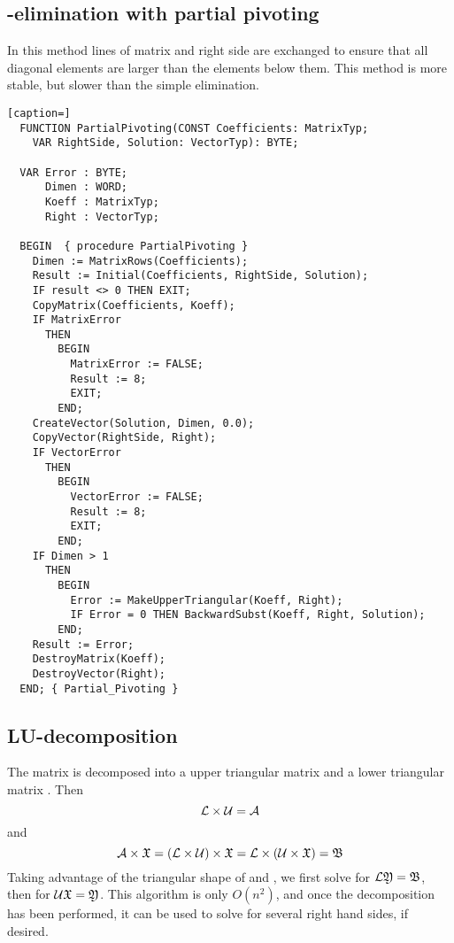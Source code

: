 \subsection{-elimination with partial pivoting}

In this method lines of matrix and right side are exchanged to ensure that all diagonal elements are larger than the elements below them. This method is more stable, but slower than the simple  elimination.

\begin{lstlisting}[caption=]
  FUNCTION PartialPivoting(CONST Coefficients: MatrixTyp;
    VAR RightSide, Solution: VectorTyp): BYTE;

  VAR Error : BYTE;
      Dimen : WORD;
      Koeff : MatrixTyp;
      Right : VectorTyp;

  BEGIN  { procedure PartialPivoting }
    Dimen := MatrixRows(Coefficients);
    Result := Initial(Coefficients, RightSide, Solution);
    IF result <> 0 THEN EXIT;
    CopyMatrix(Coefficients, Koeff);
    IF MatrixError
      THEN
        BEGIN
          MatrixError := FALSE;
          Result := 8;
          EXIT;
        END;
    CreateVector(Solution, Dimen, 0.0);
    CopyVector(RightSide, Right);
    IF VectorError
      THEN
        BEGIN
          VectorError := FALSE;
          Result := 8;
          EXIT;
        END;
    IF Dimen > 1
      THEN
        BEGIN
          Error := MakeUpperTriangular(Koeff, Right);
          IF Error = 0 THEN BackwardSubst(Koeff, Right, Solution);
        END;
    Result := Error;
    DestroyMatrix(Koeff);
    DestroyVector(Right);
  END; { Partial_Pivoting }
\end{lstlisting}

\subsection{LU-decomposition}

The matrix  is decomposed into a upper triangular matrix  and a lower triangular matrix . Then
\begin{equation}
  \mathcal{L} \times \mathcal{U} = \mathcal{A}
\end{equation}
and
\begin{equation}
  \mathcal{A} \times \mathfrak{X} = (\mathcal{L} \times \mathcal{U}) \times \mathfrak{X} = \mathcal{L} \times (\mathcal{U} \times \mathfrak{X}) = \mathfrak{B}
\end{equation}
Taking advantage of the triangular shape of  and , we first solve for \(\mathcal{L} \mathfrak{Y} = \mathfrak{B} \), then for \(\mathcal{U} \mathfrak{X} = \mathfrak{Y} \). This algorithm is only \(O(n^2) \), and once the decomposition has been performed, it can be used to solve for several right hand sides, if desired.

